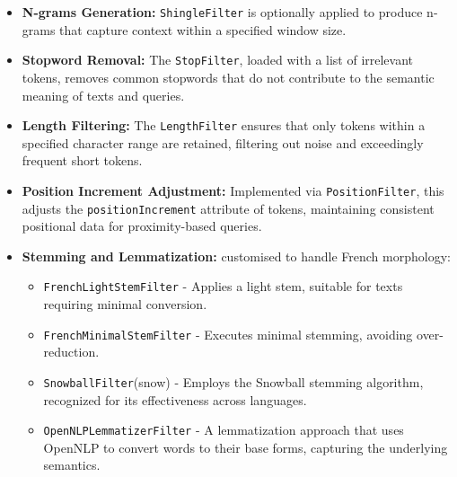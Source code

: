 \begin{itemize}
    \item \textbf{N-grams Generation:} \texttt{ShingleFilter} is optionally applied to produce n-grams that capture context within a specified window size. 

    \item \textbf{Stopword Removal:} The \texttt{StopFilter}, loaded with a list of irrelevant tokens, removes common stopwords that do not contribute to the semantic meaning of texts and queries.

    \item \textbf{Length Filtering:} The \texttt{LengthFilter} ensures that only tokens within a specified character range are retained, filtering out noise and exceedingly frequent short tokens.

    \item \textbf{Position Increment Adjustment:} Implemented via \texttt{PositionFilter}, this adjusts the \texttt{positionIncrement} attribute of tokens, maintaining consistent positional data for proximity-based queries.

    \item \textbf{Stemming and Lemmatization:} customised to handle French morphology:
    \begin{itemize}
        \item \texttt{FrenchLightStemFilter} - Applies a light stem, suitable for texts requiring minimal conversion.
        \item \texttt{FrenchMinimalStemFilter} - Executes minimal stemming, avoiding over-reduction.
        \item \texttt{SnowballFilter}(snow) - Employs the Snowball stemming algorithm, recognized for its effectiveness across languages.
        \item \texttt{OpenNLPLemmatizerFilter} - A lemmatization approach that uses OpenNLP to convert words to their base forms, capturing the underlying semantics.
    \end{itemize}
\end{itemize}

